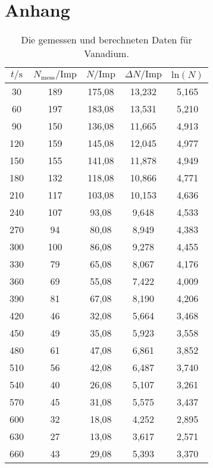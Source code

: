 \section{Anhang}
\label{sec:Anhang}
\begin{table}[H]
    \centering
    \caption{Die gemessen und berechneten Daten für Vanadium.}
    \label{tab:Vanadium}
    \begin{tabular}{| c | c | c  | c| c| }
    \toprule
    $t/\mathrm{s}$ & $N_\text{mess}/\mathrm{Imp}$ &  $N/\mathrm{Imp}$ &  $\Delta N/\mathrm{Imp}$ &  $\text{ln}(N)$ \\
    \midrule
    30	 &  189	  &   175,08	&13,232	   &  5,165  \\
    60	 &  197	  &   183,08	&13,531	   &  5,210  \\
    90	 &  150	  &   136,08	&11,665	   &  4,913  \\
    120	 &  159	  &   145,08	&12,045	   &  4,977  \\
    150	 &  155	  &   141,08	&11,878	   &  4,949  \\
    180	 &  132	  &   118,08	&10,866	   &  4,771  \\
    210	 &  117	  &   103,08	&10,153    &  4,636  \\
    240	 &  107	  &   93,08 	&9,648	   &  4,533  \\
    270	&   94	  &   80,08 	&8,949	   &  4,383  \\
    300	 &  100	  &   86,08 	&9,278	   &  4,455  \\
    330	&   79	  &   65,08 	&8,067	   &  4,176  \\
    360	&   69	  &   55,08 	&7,422	   &  4,009  \\
    390	&   81	  &   67,08 	&8,190	   &  4,206  \\
    420	&   46	  &   32,08 	&5,664	   &  3,468  \\
    450	&   49	  &   35,08 	&5,923	   &  3,558  \\
    480	&   61	  &   47,08 	&6,861	   &  3,852  \\
    510	&   56	  &   42,08 	&6,487	   &  3,740  \\
    540	&   40	  &   26,08 	&5,107	   &  3,261  \\
    570	&   45	  &   31,08 	&5,575	   &  3,437  \\
    600	&   32	  &   18,08 	&4,252	   &  2,895  \\
    630	&   27	  &   13,08 	&3,617	   &  2,571  \\
    660	&   43	  &   29,08 	&5,393	   &  3,370  \\

\end{tabular}
\end{table}
